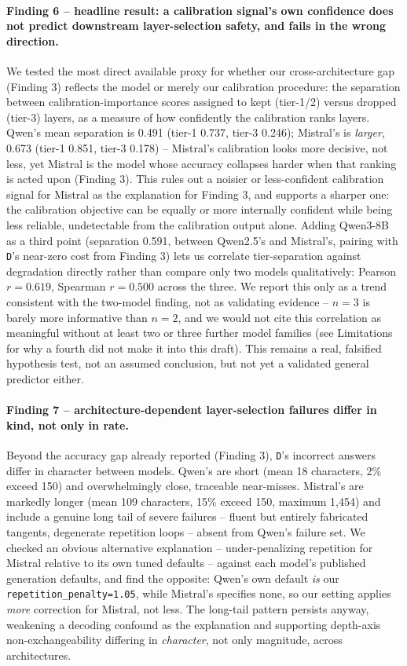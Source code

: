 \documentclass[11pt]{article}
\begin{document}
\paragraph{Finding 6 -- headline result: a calibration signal's own
confidence does not predict downstream layer-selection safety, and fails
in the wrong direction.} We tested the most direct available proxy for
whether our cross-architecture gap (Finding 3) reflects the model or
merely our calibration procedure: the separation between
calibration-importance scores assigned to kept (tier-1/2) versus dropped
(tier-3) layers, as a measure of how confidently the calibration ranks
layers. Qwen's mean separation is 0.491 (tier-1 0.737, tier-3 0.246);
Mistral's is \emph{larger}, 0.673 (tier-1 0.851, tier-3 0.178) --
Mistral's calibration looks more decisive, not less, yet Mistral is the
model whose accuracy collapses harder when that ranking is acted upon
(Finding 3). This rules out a noisier or less-confident calibration signal
for Mistral as the explanation for Finding 3, and supports a sharper one:
the calibration objective can be equally or more internally confident
while being less reliable, undetectable from the calibration output
alone. Adding Qwen3-8B as a third point (separation 0.591, between
Qwen2.5's and Mistral's, pairing with \texttt{D}'s near-zero cost from
Finding 3) lets us correlate tier-separation against degradation directly
rather than compare only two models qualitatively: Pearson $r=0.619$,
Spearman $r=0.500$ across the three. We report this only as a trend
consistent with the two-model finding, not as validating evidence --
$n=3$ is barely more informative than $n=2$, and we would not cite this
correlation as meaningful without at least two or three further model
families (see Limitations for why a fourth did not make it into this
draft). This remains a real, falsified hypothesis test, not an assumed
conclusion, but not yet a validated general predictor either.

\paragraph{Finding 7 -- architecture-dependent layer-selection failures
differ in kind, not only in rate.} Beyond the accuracy gap already
reported (Finding 3), \texttt{D}'s incorrect answers differ in character
between models. Qwen's are short (mean 18 characters, 2\% exceed 150) and
overwhelmingly close, traceable near-misses. Mistral's are markedly longer
(mean 109 characters, 15\% exceed 150, maximum 1,454) and include a
genuine long tail of severe failures -- fluent but entirely fabricated
tangents, degenerate repetition loops -- absent from Qwen's failure set.
We checked an obvious alternative explanation -- under-penalizing
repetition for Mistral relative to its own tuned defaults -- against each
model's published generation defaults, and find the opposite: Qwen's own
default \emph{is} our \texttt{repetition\_penalty=1.05}, while Mistral's
specifies none, so our setting applies \emph{more} correction for
Mistral, not less. The long-tail pattern persists anyway, weakening a
decoding confound as the explanation and supporting depth-axis
non-exchangeability differing in \emph{character}, not only magnitude,
across architectures.
\end{document}
